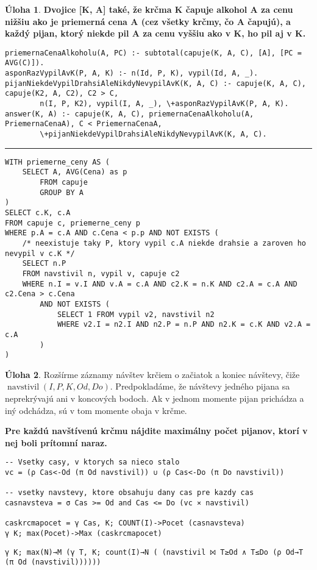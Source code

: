 \documentclass[10pt, a4paper]{article}
\theoremstyle{definition}
\newtheorem{problem}{Úloha}[section]
\def\hr{
    \bigskip
    \hrule
    \bigskip
}
\DeclareMathOperator{\navstivil}{navstivil}
\begin{document}
\begin{problem}
{\bf Dvojice [K, A] také, že krčma K čapuje alkohol A za cenu nižšiu ako je priemerná cena A (cez všetky krčmy, čo A čapujú), a každý pijan, ktorý niekde pil A za cenu vyššiu ako v K, ho pil aj v K.}\\[5mm]

\begin{verbatim}
priemernaCenaAlkoholu(A, PC) :- subtotal(capuje(K, A, C), [A], [PC = AVG(C)]).
asponRazVypilAvK(P, A, K) :- n(Id, P, K), vypil(Id, A, _).
pijanNiekdeVypilDrahsiAleNikdyNevypilAvK(K, A, C) :- capuje(K, A, C), capuje(K2, A, C2), C2 > C,
        n(I, P, K2), vypil(I, A, _), \+asponRazVypilAvK(P, A, K).
answer(K, A) :- capuje(K, A, C), priemernaCenaAlkoholu(A, PriemernaCenaA), C < PriemernaCenaA,
        \+pijanNiekdeVypilDrahsiAleNikdyNevypilAvK(K, A, C).
\end{verbatim}

\hr

\begin{verbatim}
WITH priemerne_ceny AS (
    SELECT A, AVG(Cena) as p
        FROM capuje
        GROUP BY A
)
SELECT c.K, c.A
FROM capuje c, priemerne_ceny p
WHERE p.A = c.A AND c.Cena < p.p AND NOT EXISTS (
    /* neexistuje taky P, ktory vypil c.A niekde drahsie a zaroven ho nevypil v c.K */
    SELECT n.P
    FROM navstivil n, vypil v, capuje c2
    WHERE n.I = v.I AND v.A = c.A AND c2.K = n.K AND c2.A = c.A AND c2.Cena > c.Cena
        AND NOT EXISTS (
            SELECT 1 FROM vypil v2, navstivil n2
            WHERE v2.I = n2.I AND n2.P = n.P AND n2.K = c.K AND v2.A = c.A
        )
)
\end{verbatim}
\end{problem}


\begin{problem}
Rozšírme záznamy návštev krčiem o začiatok a koniec návštevy, čiže $\navstivil(I, P, K, Od, Do)$. Predpokladáme, že návštevy jedného pijana sa neprekrývajú ani v koncových bodoch. Ak v jednom momente pijan prichádza a iný odchádza, sú v tom momente obaja v krčme.

{\bf Pre každú navštívenú krčmu nájdite maximálny počet pijanov, ktorí v nej boli prítomní naraz.}

\begin{verbatim}
-- Vsetky casy, v ktorych sa nieco stalo
vc = (ρ Cas<-Od (π Od navstivil)) ∪ (ρ Cas<-Do (π Do navstivil))

-- vsetky navstevy, ktore obsahuju dany cas pre kazdy cas
casnavsteva = σ Cas >= Od and Cas <= Do (vc ⨯ navstivil)

caskrcmapocet = γ Cas, K; COUNT(I)->Pocet (casnavsteva)
γ K; max(Pocet)->Max (caskrcmapocet)
\end{verbatim}

\begin{verbatim}
γ K; max(N)→M (γ T, K; count(I)→N ( (navstivil ⨝ T≥Od ∧ T≤Do (ρ Od→T (π Od (navstivil))))))
\end{verbatim}
\end{problem}
\end{document}
